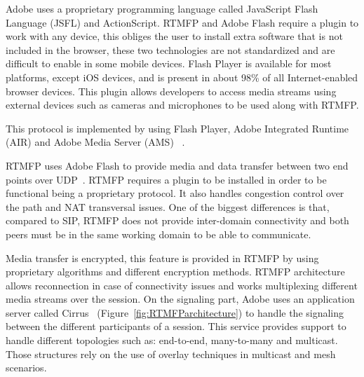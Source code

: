 Adobe uses a proprietary programming language called JavaScript Flash Language (JSFL)  and ActionScript. RTMFP and Adobe Flash require a plugin to work with any device, this obliges the user to install extra software that is not included in the browser, these two technologies are not standardized and are difficult to enable in some mobile devices. Flash Player is available for most platforms, except iOS devices, and is present in about 98\% of all Internet-enabled browser devices. This plugin allows developers to access media streams using external devices such as cameras and microphones to be used along with RTMFP.

This protocol is implemented by using Flash Player, Adobe Integrated Runtime (AIR) and Adobe Media Server (AMS) ~\cite{rtmfpDraft}. 

RTMFP uses Adobe Flash to provide media and data transfer between two end points over UDP~\cite{rtmfpDraft}. RTMFP requires a plugin to be installed in order to be functional being a proprietary protocol. It also handles congestion control over the path and NAT transversal issues. One of the biggest differences is that, compared to SIP, RTMFP does not provide inter-domain connectivity and both peers must be in the same working domain to be able to communicate.

Media transfer is encrypted, this feature is provided in RTMFP by using proprietary algorithms and different encryption methods. RTMFP architecture allows reconnection in case of connectivity issues and works multiplexing different media streams over the session. On the signaling part, Adobe uses an application server called Cirrus~\cite{cirrusFAQ} (Figure~\ref{fig:RTMFParchitecture}) to handle the signaling between the different participants of a session. This service provides support to handle different topologies such as: end-to-end, many-to-many and multicast. Those structures rely on the use of overlay techniques in multicast and mesh scenarios. 
 
